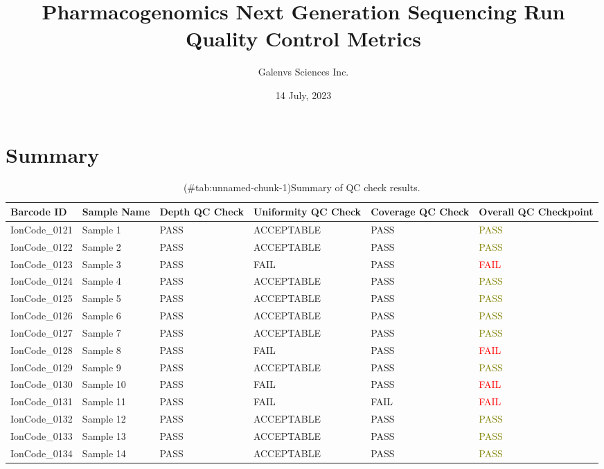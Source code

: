 \documentclass[
]{article}
\title{Pharmacogenomics Next Generation Sequencing Run Quality Control Metrics}
\author{Galenvs Sciences Inc.}
\date{14 July, 2023}
\begin{document}
\maketitle

\hypertarget{summary}{%
\section{Summary}\label{summary}}

\begin{longtable}[t]{>{\raggedright\arraybackslash}p{2cm}>{\raggedright\arraybackslash}p{2cm}>{\raggedright\arraybackslash}p{1.6cm}>{\raggedright\arraybackslash}p{3cm}>{\raggedright\arraybackslash}p{1.6cm}>{}l}
\caption{(\#tab:unnamed-chunk-1)Summary of QC check results.}\\
\toprule
Barcode ID & Sample Name & Depth QC Check & Uniformity QC Check & Coverage QC Check & Overall QC Checkpoint\\
\midrule
IonCode\_0121 & Sample 1 & PASS & ACCEPTABLE & PASS & \textcolor{olive}{PASS}\\
IonCode\_0122 & Sample 2 & PASS & ACCEPTABLE & PASS & \textcolor{olive}{PASS}\\
IonCode\_0123 & Sample 3 & PASS & FAIL & PASS & \textcolor{red}{FAIL}\\
IonCode\_0124 & Sample 4 & PASS & ACCEPTABLE & PASS & \textcolor{olive}{PASS}\\
IonCode\_0125 & Sample 5 & PASS & ACCEPTABLE & PASS & \textcolor{olive}{PASS}\\
\addlinespace
IonCode\_0126 & Sample 6 & PASS & ACCEPTABLE & PASS & \textcolor{olive}{PASS}\\
IonCode\_0127 & Sample 7 & PASS & ACCEPTABLE & PASS & \textcolor{olive}{PASS}\\
IonCode\_0128 & Sample 8 & PASS & FAIL & PASS & \textcolor{red}{FAIL}\\
IonCode\_0129 & Sample 9 & PASS & ACCEPTABLE & PASS & \textcolor{olive}{PASS}\\
IonCode\_0130 & Sample 10 & PASS & FAIL & PASS & \textcolor{red}{FAIL}\\
\addlinespace
IonCode\_0131 & Sample 11 & PASS & FAIL & FAIL & \textcolor{red}{FAIL}\\
IonCode\_0132 & Sample 12 & PASS & ACCEPTABLE & PASS & \textcolor{olive}{PASS}\\
IonCode\_0133 & Sample 13 & PASS & ACCEPTABLE & PASS & \textcolor{olive}{PASS}\\
IonCode\_0134 & Sample 14 & PASS & ACCEPTABLE & PASS & \textcolor{olive}{PASS}\\
\bottomrule
\end{longtable}
\newpage
\end{document}
